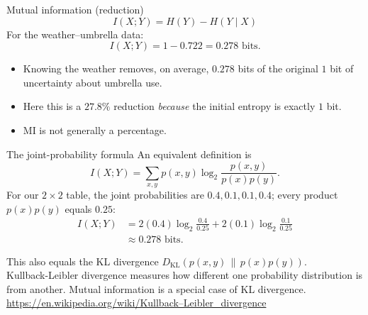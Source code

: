 \documentclass[aspectratio=43,11pt]{beamer}
\begin{document}
\begin{frame}{Mutual information (reduction)}
\[
\boxed{I(X;Y)=H(Y)-H(Y\mid X)}
\]
For the weather--umbrella data:
\[
I(X;Y)=1-0.722=\boxed{0.278\text{ bits}}.
\]
\begin{itemize}
\item Knowing the weather removes, on average, $0.278$ bits of the original $1$ bit of uncertainty about umbrella use.
\item Here this is a $27.8\%$ reduction \emph{because} the initial entropy is exactly $1$ bit.
\item MI is not generally a percentage.
\end{itemize}
\end{frame}

\begin{frame}{The joint-probability formula}
An equivalent definition is
\[
\boxed{I(X;Y)=\sum_{x,y}p(x,y)\log_2\frac{p(x,y)}{p(x)p(y)}}.
\]
\small
For our $2\times2$ table, the joint probabilities are $0.4,0.1,0.1,0.4$; every product $p(x)p(y)$ equals $0.25$:
\begin{align*}
I(X;Y)&=2(0.4)\log_2\frac{0.4}{0.25}
+2(0.1)\log_2\frac{0.1}{0.25}\\
&\approx\boxed{0.278\text{ bits}}.
\end{align*}

This also equals the KL divergence $D_{\mathrm{KL}}(p(x,y)\,\|\,p(x)p(y))$.\\
\medskip
\tiny{Kullback-Leibler divergence measures how different one probability distribution is from another. Mutual information is a special case of KL divergence. \url{https://en.wikipedia.org/wiki/Kullback–Leibler_divergence}}
\end{frame}
\end{document}
